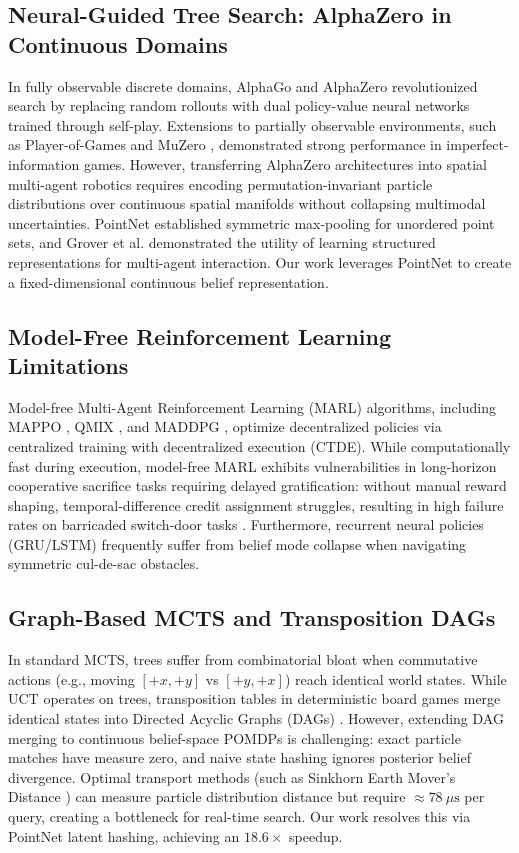 \documentclass[conference]{IEEEtran}
\begin{document}
\subsection{Neural-Guided Tree Search: AlphaZero in Continuous Domains}
In fully observable discrete domains, AlphaGo and AlphaZero \cite{silver2017mastering, silver2018general} revolutionized search by replacing random rollouts with dual policy-value neural networks trained through self-play. Extensions to partially observable environments, such as Player-of-Games \cite{schmid2023player} and MuZero \cite{schrittwieser2020mastering}, demonstrated strong performance in imperfect-information games. However, transferring AlphaZero architectures into spatial multi-agent robotics requires encoding permutation-invariant particle distributions over continuous spatial manifolds without collapsing multimodal uncertainties. PointNet \cite{qi2017pointnet} established symmetric max-pooling for unordered point sets, and Grover et al. \cite{grover2018learning} demonstrated the utility of learning structured representations for multi-agent interaction. Our work leverages PointNet to create a fixed-dimensional continuous belief representation.

\subsection{Model-Free Reinforcement Learning Limitations}
Model-free Multi-Agent Reinforcement Learning (MARL) algorithms, including MAPPO \cite{yu2022surprising}, QMIX \cite{rashid2018qmix}, and MADDPG \cite{lowe2017multi}, optimize decentralized policies via centralized training with decentralized execution (CTDE). While computationally fast during execution, model-free MARL exhibits vulnerabilities in long-horizon cooperative sacrifice tasks requiring delayed gratification: without manual reward shaping, temporal-difference credit assignment struggles, resulting in high failure rates on barricaded switch-door tasks \cite{rashid2018qmix}. Furthermore, recurrent neural policies (GRU/LSTM) frequently suffer from belief mode collapse when navigating symmetric cul-de-sac obstacles.

\subsection{Graph-Based MCTS and Transposition DAGs}
In standard MCTS, trees suffer from combinatorial bloat when commutative actions (e.g., moving $[+x, +y]$ vs $[+y, +x]$) reach identical world states. While UCT \cite{kocsis2006bandit} operates on trees, transposition tables in deterministic board games merge identical states into Directed Acyclic Graphs (DAGs) \cite{sunehag2017value}. However, extending DAG merging to continuous belief-space POMDPs is challenging: exact particle matches have measure zero, and naive state hashing ignores posterior belief divergence. Optimal transport methods (such as Sinkhorn Earth Mover's Distance \cite{cuturi2013sinkhorn}) can measure particle distribution distance but require $\approx 78\ \mu\text{s}$ per query, creating a bottleneck for real-time search. Our work resolves this via PointNet latent hashing, achieving an $18.6\times$ speedup.
\end{document}
